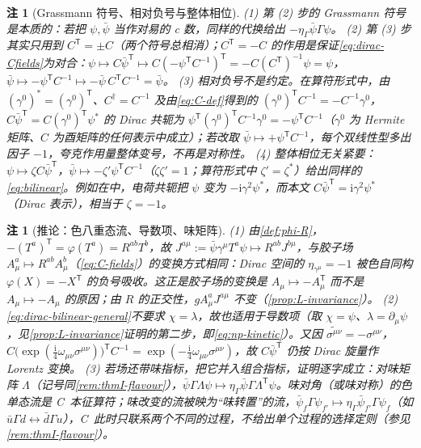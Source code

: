 \documentclass[UTF8,a4paper,11pt,fontset=fandol]{ctexart}
\theoremstyle{cplain}
\theoremstyle{cdefinition}
\theoremstyle{cremark}
\newtheorem{remark}[theorem]{注}
\numberwithin{equation}{section}
\newcommand{\tp}{\mathsf{T}}                         %
\newcommand{\ii}{\mathrm{i}}                        %
\newcommand{\Cconj}[1]{\widetilde{#1}}              %
\begin{document}
\begin{remark}[Grassmann 符号、相对负号与整体相位]\label{rem:dirac-phase}
(1) 第 (2) 步的 Grassmann 符号是本质的：若把 $\psi,\bar\psi$ 当作对易的 c 数，同样的代换给出 $-\eta_\Gamma\bar\psi\Gamma\psi$。
(2) 第 (3) 步其实只用到 $C^{\tp}=\pm C$（两个符号总相消）；$C^{\tp}=-C$ 的作用是保证\cref{eq:dirac-Cfields}为对合：$\psi\mapsto C\bar\psi^{\tp}\mapsto C(-\psi^{\tp}C^{-1})^{\tp}=-C(C^{\tp})^{-1}\psi=\psi$，$\bar\psi\mapsto-\psi^{\tp}C^{-1}\mapsto-\bar\psi\,C^{\tp}C^{-1}=\bar\psi$。
(3) 相对负号不是约定。在算符形式中，由 $(\gamma^0)^*=(\gamma^0)^{\tp}$、$C^\dagger=C^{-1}$ 及由\cref{eq:C-def}得到的 $(\gamma^0)^{\tp}C^{-1}=-C^{-1}\gamma^0$，$C\bar\psi^{\tp}=C(\gamma^0)^{\tp}\psi^*$ 的 Dirac 共轭为 $\psi^{\tp}(\gamma^0)^{\tp}C^{-1}\gamma^0=-\psi^{\tp}C^{-1}$（$\gamma^0$ 为 Hermite 矩阵、$C$ 为酉矩阵的任何表示中成立）；若改取 $\bar\psi\mapsto+\psi^{\tp}C^{-1}$，每个双线性型多出因子 $-1$，夸克作用量整体变号，不再是对称性。
(4) 整体相位无关紧要：$\psi\mapsto\zeta C\bar\psi^{\tp}$，$\bar\psi\mapsto-\zeta'\psi^{\tp}C^{-1}$（$\zeta\zeta'=1$；算符形式中 $\zeta'=\zeta^*$）给出同样的\cref{eq:bilinear}。例如在\cite[第~3.6~节]{PeskinSchroeder1995}中，电荷共轭把 $\psi$ 变为 $-\ii\gamma^2\psi^*$，而本文 $C\bar\psi^{\tp}=\ii\gamma^2\psi^*$（Dirac 表示），相当于 $\zeta=-1$。
\end{remark}

\begin{remark}[推论：色八重态流、导数项、味矩阵]\label{rem:dirac-octet}
(1) 由\cref{def:phi-R}，$-(T^a)^{\tp}=\varphi(T^a)=R^{ab}T^b$，故 $J^{a\mu}:=\bar\psi\gamma^\mu T^a\psi\mapsto R^{ab}J^{b\mu}$，与胶子场 $A^a_\mu\mapsto R^{ab}A^b_\mu$（\cref{eq:C-fields}）的变换方式相同：Dirac 空间的 $\eta_{\gamma^\mu}=-1$ 被色自同构 $\varphi(X)=-X^{\tp}$ 的负号吸收。这正是胶子场的变换是 $A_\mu\mapsto-A_\mu^{\tp}$ 而不是 $A_\mu\mapsto-A_\mu$ 的原因；由 $R$ 的正交性，$gA^a_\mu J^{a\mu}$ 不变（\cref{prop:L-invariance}）。
(2) \cref{eq:dirac-bilinear-general}不要求 $\chi=\lambda$，故也适用于导数项（取 $\chi=\psi$、$\lambda=\partial_\mu\psi$，见\cref{prop:L-invariance}证明的第二步，即\cref{eq:np-kinetic}）。又因 $\Cconj{\sigma^{\mu\nu}}=-\sigma^{\mu\nu}$，$C\bigl(\exp(\tfrac{\ii}{4}\omega_{\mu\nu}\sigma^{\mu\nu})\bigr)^{\tp}C^{-1}=\exp(-\tfrac{\ii}{4}\omega_{\mu\nu}\sigma^{\mu\nu})$，故 $C\bar\psi^{\tp}$ 仍按 Dirac 旋量作 Lorentz 变换。
(3) 若场还带味指标，把它并入组合指标，证明逐字成立：对味矩阵 $\Lambda$（记号同\cref{rem:thmI-flavour}），$\bar\psi\Gamma\Lambda\psi\mapsto\eta_\Gamma\bar\psi\Gamma\Lambda^{\tp}\psi$。味对角（或味对称）的色单态流是 C~本征算符；味改变的流被映为“味转置”的流，$\bar\psi_f\Gamma\psi_{f'}\mapsto\eta_\Gamma\bar\psi_{f'}\Gamma\psi_f$（如 $\bar u\Gamma d\leftrightarrow\bar d\Gamma u$），C~此时只联系两个不同的过程，不给出单个过程的选择定则（参见\cref{rem:thmI-flavour}）。
\end{remark}
\end{document}
